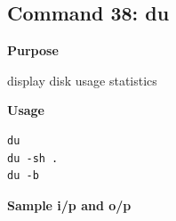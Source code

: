 \subsection{Command 38: du} 
\textbf{Purpose}
\begin{flushleft}
 display disk usage statistics
\end{flushleft}
\textbf{Usage}
\begin{verbatim}
du
du -sh .
du -b
\end{verbatim}
\textbf{Sample i/p and o/p}
\begin{figure}[H] 
\end{figure}
